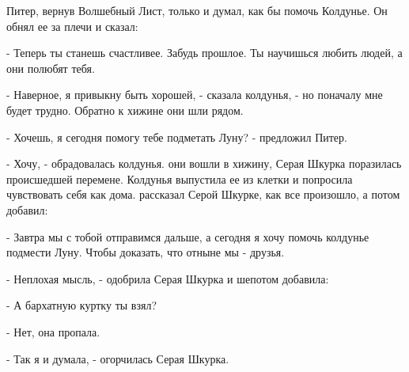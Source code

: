  Питер, вернув Волшебный Лист, только и думал, как бы помочь 
Колдунье. Он обнял ее за плечи и сказал:
\par- Теперь ты станешь счастливее. Забудь прошлое. Ты научишься 
любить людей, а они полюбят тебя.
\par- Наверное, я привыкну быть хорошей, - сказала колдунья, - но 
поначалу мне будет трудно. Обратно к хижине они шли рядом.
\par- Хочешь, я сегодня помогу тебе подметать Луну? - предложил Питер.
\par- Хочу, - обрадовалась колдунья.
 они вошли в хижину, Серая Шкурка поразилась происшедшей 
перемене. Колдунья выпустила ее из клетки и попросила чувствовать себя 
как дома.
 рассказал Серой Шкурке, как все произошло, а потом добавил:
\par- Завтра мы с тобой отправимся дальше, а сегодня я хочу помочь 
колдунье подмести Луну. Чтобы доказать, что отныне мы - друзья.
\par- Неплохая мысль, - одобрила Серая Шкурка и шепотом добавила:
\par- А бархатную куртку ты взял?
\par- Нет, она пропала.
\par- Так я и думала, - огорчилась Серая Шкурка.
